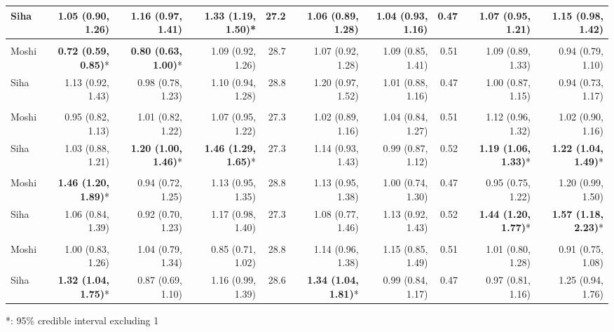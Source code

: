 \begin{table}[t]
\begin{tabular*}{\linewidth}{@{\extracolsep{\fill}}l|rrrrrrrrr}
Siha & 1.05 (0.90, 1.26) & 1.16 (0.97, 1.41) & \textbf{1.33 (1.19, 1.50)}* & 27.2 & 1.06 (0.89, 1.28) & 1.04 (0.93, 1.16) & 0.47 & 1.07 (0.95, 1.21) & 1.15 (0.98, 1.42) \\ 
\midrule\addlinespace[2.5pt]
\multicolumn{10}{l}{Diarrhea} \\[2.5pt] 
\midrule\addlinespace[2.5pt]
Moshi & \textbf{0.72 (0.59, 0.85)}* & \textbf{0.80 (0.63, 1.00)}* & 1.09 (0.92, 1.26) & 28.7 & 1.07 (0.92, 1.28) & 1.09 (0.85, 1.41) & 0.51 & 1.09 (0.89, 1.33) & 0.94 (0.79, 1.10) \\ 
Siha & 1.13 (0.92, 1.43) & 0.98 (0.78, 1.23) & 1.10 (0.94, 1.28) & 28.8 & 1.20 (0.97, 1.52) & 1.01 (0.88, 1.16) & 0.47 & 1.00 (0.87, 1.15) & 0.94 (0.73, 1.17) \\ 
\midrule\addlinespace[2.5pt]
\multicolumn{10}{l}{Urinary Tract Infections} \\[2.5pt] 
\midrule\addlinespace[2.5pt]
Moshi & 0.95 (0.82, 1.13) & 1.01 (0.82, 1.22) & 1.07 (0.95, 1.22) & 27.3 & 1.02 (0.89, 1.16) & 1.04 (0.84, 1.27) & 0.51 & 1.12 (0.96, 1.32) & 1.02 (0.90, 1.16) \\ 
Siha & 1.03 (0.88, 1.21) & \textbf{1.20 (1.00, 1.46)}* & \textbf{1.46 (1.29, 1.65)}* & 27.3 & 1.14 (0.93, 1.43) & 0.99 (0.87, 1.12) & 0.52 & \textbf{1.19 (1.06, 1.33)}* & \textbf{1.22 (1.04, 1.49)}* \\ 
\midrule\addlinespace[2.5pt]
\multicolumn{10}{l}{Malaria} \\[2.5pt] 
\midrule\addlinespace[2.5pt]
Moshi & \textbf{1.46 (1.20, 1.89)}* & 0.94 (0.72, 1.25) & 1.13 (0.95, 1.35) & 28.8 & 1.13 (0.95, 1.38) & 1.00 (0.74, 1.30) & 0.47 & 0.95 (0.75, 1.22) & 1.20 (0.99, 1.50) \\ 
Siha & 1.06 (0.84, 1.39) & 0.92 (0.70, 1.23) & 1.17 (0.98, 1.40) & 27.3 & 1.08 (0.77, 1.46) & 1.13 (0.92, 1.43) & 0.52 & \textbf{1.44 (1.20, 1.77)}* & \textbf{1.57 (1.18, 2.23)}* \\ 
\midrule\addlinespace[2.5pt]
\multicolumn{10}{l}{Infectious Eye Disease} \\[2.5pt] 
\midrule\addlinespace[2.5pt]
Moshi & 1.00 (0.83, 1.26) & 1.04 (0.79, 1.34) & 0.85 (0.71, 1.02) & 28.8 & 1.14 (0.96, 1.38) & 1.15 (0.85, 1.49) & 0.51 & 1.01 (0.80, 1.28) & 0.91 (0.75, 1.08) \\ 
Siha & \textbf{1.32 (1.04, 1.75)}* & 0.87 (0.69, 1.10) & 1.16 (0.99, 1.39) & 28.6 & \textbf{1.34 (1.04, 1.81)}* & 0.99 (0.84, 1.17) & 0.47 & 0.97 (0.81, 1.16) & 1.25 (0.94, 1.76) \\ 
\bottomrule
\end{tabular*}
\begin{minipage}{\linewidth}
*: 95\% credible interval excluding 1\\
\end{minipage}
\end{table}

